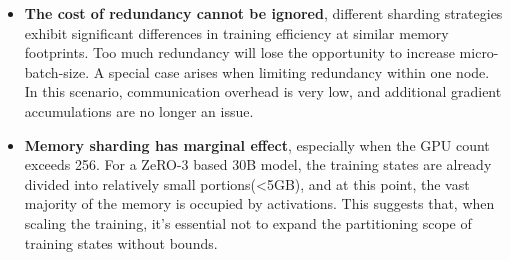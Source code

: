 \begin{itemize}[leftmargin=*]
\item \textbf{The cost of redundancy cannot be ignored}, different sharding strategies exhibit significant differences in training efficiency at similar memory footprints. Too much redundancy will lose the opportunity to increase micro-batch-size. A special case arises when limiting redundancy within one node. In this scenario, communication overhead is very low, and additional gradient accumulations are no longer an issue.

\item \textbf{Memory sharding has marginal effect}, especially when the GPU count exceeds 256. For a ZeRO-3 based 30B model, the training states are already divided into relatively small portions(<5GB), and at this point, the vast majority of the memory is occupied by activations. This suggests that, when scaling the training, it's essential not to expand the partitioning scope of training states without bounds.
\end{itemize}